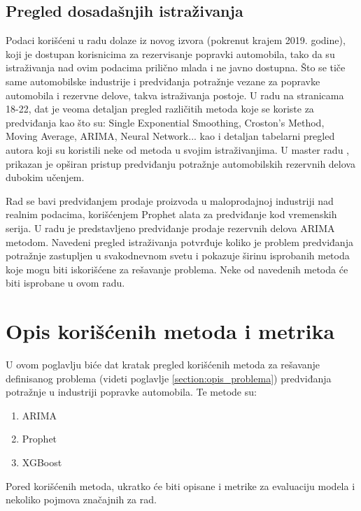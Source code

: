 \documentclass[12pt,oneside]{memoir}
\begin{document}
\section{Pregled dosadašnjih istraživanja}
Podaci korišćeni u radu dolaze iz novog izvora (pokrenut krajem 2019. godine), koji je dostupan korisnicima za rezervisanje popravki automobila, tako da su istraživanja nad ovim podacima prilično mlada i ne javno dostupna. Što se tiče same automobilske industrije i predviđanja potražnje vezane za popravke automobila i rezervne delove, takva istraživanja postoje. U radu \cite{faccio2010forecasting} na stranicama 18-22, dat je veoma detaljan pregled različitih metoda koje se koriste za predviđanja kao što su: Single Exponential Smoothing, Croston's Method, Moving Average, ARIMA, Neural Network... kao i detaljan tabelarni pregled autora koji su koristili neke od metoda u svojim istraživanjima. U master radu \cite{henkelmann2018deep}, prikazan je opširan pristup predviđanju potražnje automobilskih rezervnih delova dubokim učenjem. 

Rad \cite{zunic2020application} se bavi predviđanjem prodaje proizvoda u maloprodajnoj industriji nad realnim podacima, korišćenjem Prophet alata za predviđanje kod vremenskih serija. U radu \cite{saravanan2019forecasting} je predstavljeno predviđanje prodaje rezervnih delova ARIMA metodom. Navedeni pregled istraživanja potvrđuje koliko je problem predviđanja potražnje zastupljen u svakodnevnom svetu i pokazuje širinu isprobanih metoda koje mogu biti iskorišćene za rešavanje problema. Neke od navedenih metoda će biti isprobane u ovom radu.



\chapter{Opis korišćenih metoda i metrika}
\label{chp:metode}
U ovom poglavlju biće dat kratak pregled korišćenih metoda za rešavanje definisanog problema (videti poglavlje \ref{section:opis_problema}) predviđanja potražnje u industriji popravke automobila. Te metode su: 
\begin{enumerate}
    \item ARIMA
    \item Prophet
    \item XGBoost
\end{enumerate}
Pored korišćenih metoda, ukratko će biti opisane i metrike za evaluaciju modela i nekoliko pojmova značajnih za rad.
\end{document}
